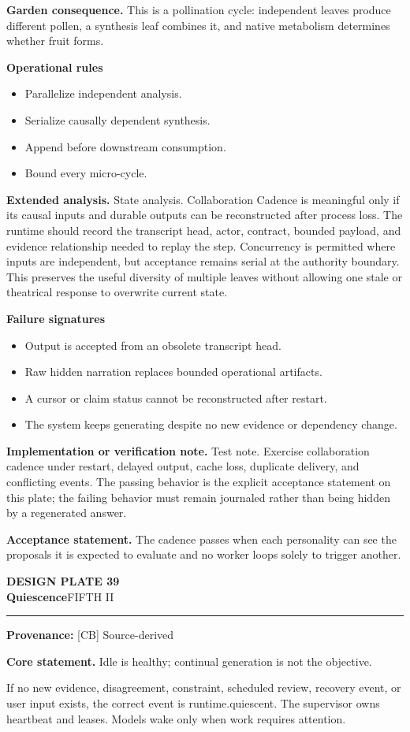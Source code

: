 \documentclass[10pt,letterpaper,oneside]{article}
\newcommand{\prov}[1]{\textcolor{gardenBlue}{\sffamily\footnotesize\textbf{Provenance:} #1}}
\newcommand{\platetitle}[3]{%
  \begin{minipage}[t][0.54in][t]{\textwidth}
  {\sffamily\bfseries\color{gardenDeep}\fontsize{9}{10}\selectfont DESIGN PLATE #1}\\[-1pt]
  {\sffamily\bfseries\color{gardenInk}\fontsize{16.5}{18}\selectfont #2}\hfill{\sffamily\color{gardenGreen}\large #3}
  \end{minipage}\vspace{-2pt}\hrule\vspace{5pt}}
\begin{document}
\textbf{Garden consequence.} This is a pollination cycle: independent leaves produce different pollen, a synthesis leaf combines it, and native metabolism determines whether fruit forms.

\textbf{Operational rules}
\begin{itemize}
\item Parallelize independent analysis.
\item Serialize causally dependent synthesis.
\item Append before downstream consumption.
\item Bound every micro-cycle.
\end{itemize}
\textbf{Extended analysis.} State analysis. Collaboration Cadence is meaningful only if its causal inputs and durable outputs can be reconstructed after process loss. The runtime should record the transcript head, actor, contract, bounded payload, and evidence relationship needed to replay the step. Concurrency is permitted where inputs are independent, but acceptance remains serial at the authority boundary. This preserves the useful diversity of multiple leaves without allowing one stale or theatrical response to overwrite current state.

\textbf{Failure signatures}
\begin{itemize}
\item Output is accepted from an obsolete transcript head.
\item Raw hidden narration replaces bounded operational artifacts.
\item A cursor or claim status cannot be reconstructed after restart.
\item The system keeps generating despite no new evidence or dependency change.
\end{itemize}
\textbf{Implementation or verification note.} Test note. Exercise collaboration cadence under restart, delayed output, cache loss, duplicate delivery, and conflicting events. The passing behavior is the explicit acceptance statement on this plate; the failing behavior must remain journaled rather than being hidden by a regenerated answer.

\begin{acceptbox}
\textbf{Acceptance statement.} The cadence passes when each personality can see the proposals it is expected to evaluate and no worker loops solely to trigger another.
\end{acceptbox}
\newpage
\platetitle{39}{Quiescence}{FIFTH II}
\prov{[CB] Source-derived}
\fontsize{8.85}{10.45}\selectfont
\begin{corebox}
\textbf{Core statement.} Idle is healthy; continual generation is not the objective.
\end{corebox}
If no new evidence, disagreement, constraint, scheduled review, recovery event, or user input exists, the correct event is runtime.quiescent. The supervisor owns heartbeat and leases. Models wake only when work requires attention.
\end{document}
